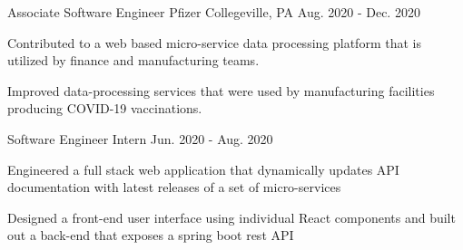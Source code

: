 \begin{cventries}
  \cventry
    {Associate Software Engineer} %
    {Pfizer} %
    {Collegeville, PA} %
    {Aug. 2020 - Dec. 2020} %
    {
      \begin{cvitems} %
        \item {Contributed to a web based micro-service data processing platform that is utilized by finance and manufacturing teams.}
        \item {Improved data-processing services that were used by manufacturing facilities producing COVID-19 vaccinations.}
      \end{cvitems}
    }

  \cventry
    {Software Engineer Intern} %
    {} %
    {} %
    {Jun. 2020 - Aug. 2020} %
    {
      \begin{cvitems} %
        \item {Engineered a full stack web application that dynamically updates API documentation with latest releases of a set of micro-services}
        \item {Designed a front-end user interface using individual React components and built out a back-end that exposes a spring boot rest API}
      \end{cvitems}
    }

\end{cventries}

